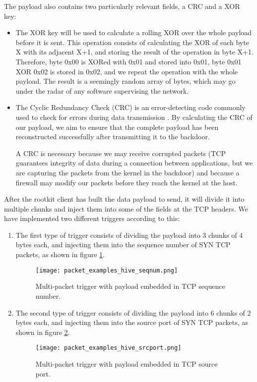 The payload also contains two particularly relevant fields, a CRC and a XOR key:
\begin{itemize}
\item The XOR key will be used to calculate a rolling XOR over the whole payload before it is sent. This operation consists of calculating the XOR of each byte X with its adjacent X+1, and storing the result of the operation in byte X+1. Therefore, byte 0x00 is XORed with 0x01 and stored into 0x01, byte 0x01 XOR 0x02 is stored in 0x02, and we repeat the operation with the whole payload. The result is a seemingly random array of bytes, which may go under the radar of any software supervising the network.
\item The Cyclic Redundancy Check (CRC) is an error-detecting code commonly used to check for errors during data transmission \cite{crc}. By calculating the CRC of our payload, we aim to ensure that the complete payload has been reconstructed successfully after transmitting it to the backdoor.

A CRC is necessary because we may receive corrupted packets (TCP guarantees integrity of data during a connection between applications, but we are capturing the packets from the kernel in the backdoor) and because a firewall may modify our packets before they reach the kernel at the host.
\end{itemize}

After the rootkit client has built the data payload to send, it will divide it into multiple chunks and inject them into some of the fields at the TCP headers. We have implemented two different triggers according to this:
\begin{enumerate}
\item The first type of trigger consists of dividing the payload into 3 chunks of 4 bytes each, and injecting them into the sequence number of SYN TCP packets, as shown in figure \ref{fig:hive_seqnum}.

\begin{figure}[htbp]
	\centering
	\texttt{[image: packet\_examples\_hive\_seqnum.png]}
	\caption{Multi-packet trigger with payload embedded in TCP sequence number.}
	\label{fig:hive_seqnum}
\end{figure}

\item The second type of trigger consists of dividing the payload into 6 chunks of 2 bytes each, and injecting them into the source port of SYN TCP packets, as shown in figure \ref{fig:hive_srcport}.

\begin{figure}[htbp]
	\centering
	\texttt{[image: packet\_examples\_hive\_srcport.png]}
	\caption{Multi-packet trigger with payload embedded in TCP source port.}
	\label{fig:hive_srcport}
\end{figure}

\end{enumerate}

